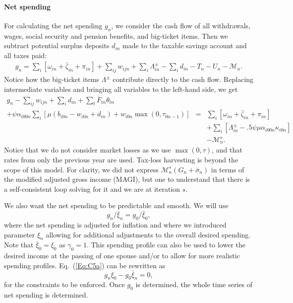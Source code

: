\documentclass{report}[fleqn,12pt]
\begin{document}
\paragraph*{Net spending}
	For calculating the net spending $g_n$, we consider the cash flow of all withdrawals,
	wages, social security and pension benefits, and big-ticket items. 
	Then we subtract potential surplus deposits $d_{in}$ made to the taxable savings account
	and all taxes paid:
	\begin{eqnarray}
		g_n = \sum_i [\omega_{in} + \bar{\zeta}_{in} + \pi_{in} ] 
		+ \sum_{ij} w_{ijn} + \sum_i \Lambda^\pm_{in} - \sum_{i}d_{in}
		- T_n - U_n - \mathcal{M}_n.
	\end{eqnarray}
	Notice how the big-ticket items $\Lambda^\pm$ contribute directly to the cash flow.
	Replacing intermediate variables and bringing all variables to the left-hand side, we get
	\begin{eqnarray}
		\label{Eq:C4}
		g_n - \sum_{ij} w_{ijn} + \sum_{i}d_{in}
		+ \sum_t \bar{F}_{tn} \theta_{t n} &&\nonumber \\
		+ \psi\alpha_{i00n} \sum_{i} \left[\mu(b_{i0n} - w_{i0n} + d_{in})
		+ w_{i0n}\max(0, \tau_{0n-1})\right] 
		&=& \sum_i [\omega_{in} + \bar{\zeta}_{in} + \pi_{in} ] \nonumber\\
		&& + \sum_i [\Lambda^\pm_{in} - .5\psi\mu\alpha_{i00n}\kappa_{i0n}] \nonumber\\
		&& - \mathcal{M}_n^s.
	\end{eqnarray}
	Notice that we do not consider market losses as we use $\max(0, \tau)$, and that
	rates from only the previous year are used. Tax-loss
	harvesting is beyond the scope of this model.
	For clarity, we did not express $\mathcal{M}_n^s(G_n+\bar{\sigma}_n)$ in terms of the modified
	adjusted gross income (MAGI), but one to understand that there is a self-consistent
	loop solving for it and we are at iteration $s$.

	We also want the net spending to be predictable and smooth. We will use
\begin{equation}
	\label{Eq:C5a}
	g_{n}/\bar{\xi}_{n} = g_0/\bar{\xi}_0,
\end{equation}
where the net spending is adjusted for inflation and where we introduced parameter $\xi_n$ 
allowing for additional adjustments to the overall desired spending.
Note that $\bar{\xi}_0 = \xi_0$ as $\gamma_0=1$.
This spending profile can also be used to lower the desired income at the passing
of one spouse and/or to allow for more realistic spending profiles.
Eq.~(\ref{Eq:C5a}) can be rewritten as
\begin{equation}
	\label{Eq:C5}
	g_n \xi_0 - g_0 \bar{\xi}_n = 0,
\end{equation}
for the constraints to be enforced. Once $g_0$ is determined, the whole time series of net spending
is determined.
\end{document}
